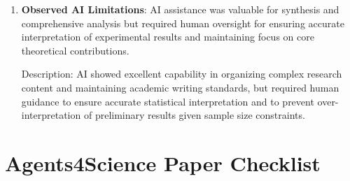 \documentclass{article}
\begin{document}
\begin{enumerate}
    Answer: \textbf{Mostly AI, assisted by human}
    
    Explanation: While the research insights and experimental framework were human-generated, AI played a major role in synthesizing extensive research content into coherent academic narrative, integrating complex experimental results, and ensuring comprehensive coverage of findings and implications.

    \item \textbf{Observed AI Limitations}: AI assistance was valuable for synthesis and comprehensive analysis but required human oversight for ensuring accurate interpretation of experimental results and maintaining focus on core theoretical contributions.

     
    Description: AI showed excellent capability in organizing complex research content and maintaining academic writing standards, but required human guidance to ensure accurate statistical interpretation and to prevent over-interpretation of preliminary results given sample size constraints.
\end{enumerate}

\section*{Agents4Science Paper Checklist}
\end{document}
